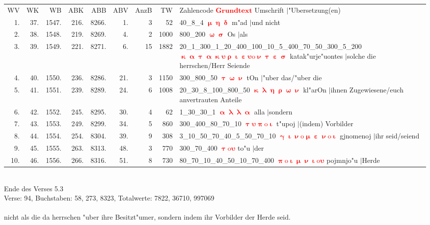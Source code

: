 \documentclass[a4paper,10pt,landscape]{article}
\begin{document}
\begin{tabular}{rrrrrrrrp{120mm}}
WV&WK&WB&ABK&ABB&ABV&AnzB&TW&Zahlencode \textcolor{red}{$\boldsymbol{Grundtext}$} Umschrift $|$"Ubersetzung(en)\\
1.&37.&1547.&216.&8266.&1.&3&52&40\_8\_4 \textcolor{red}{$\boldsymbol{\upmu\upeta\updelta}$} m"ad $|$und nicht\\
2.&38.&1548.&219.&8269.&4.&2&1000&800\_200 \textcolor{red}{$\boldsymbol{\upomega\upsigma}$} Os $|$als\\
3.&39.&1549.&221.&8271.&6.&15&1882&20\_1\_300\_1\_20\_400\_100\_10\_5\_400\_70\_50\_300\_5\_200 \textcolor{red}{$\boldsymbol{\upkappa\upalpha\uptau\upalpha\upkappa\upsilon\uprho\upiota\upepsilon\upsilon\mathrm{o}\upnu\uptau\upepsilon\upsigma}$} katak"urje"uontes $|$solche die herrschen/Herr Seiende\\
4.&40.&1550.&236.&8286.&21.&3&1150&300\_800\_50 \textcolor{red}{$\boldsymbol{\uptau\upomega\upnu}$} tOn $|$"uber das/"uber die\\
5.&41.&1551.&239.&8289.&24.&6&1008&20\_30\_8\_100\_800\_50 \textcolor{red}{$\boldsymbol{\upkappa\uplambda\upeta\uprho\upomega\upnu}$} kl"arOn $|$ihnen Zugewiesene/euch anvertrauten Anteile\\
6.&42.&1552.&245.&8295.&30.&4&62&1\_30\_30\_1 \textcolor{red}{$\boldsymbol{\upalpha\uplambda\uplambda\upalpha}$} alla $|$sondern\\
7.&43.&1553.&249.&8299.&34.&5&860&300\_400\_80\_70\_10 \textcolor{red}{$\boldsymbol{\uptau\upsilon\uppi\mathrm{o}\upiota}$} t"upoj $|$(indem) Vorbilder\\
8.&44.&1554.&254.&8304.&39.&9&308&3\_10\_50\_70\_40\_5\_50\_70\_10 \textcolor{red}{$\boldsymbol{\upgamma\upiota\upnu\mathrm{o}\upmu\upepsilon\upnu\mathrm{o}\upiota}$} gjnomenoj $|$ihr seid/seiend\\
9.&45.&1555.&263.&8313.&48.&3&770&300\_70\_400 \textcolor{red}{$\boldsymbol{\uptau\mathrm{o}\upsilon}$} to"u $|$der\\
10.&46.&1556.&266.&8316.&51.&8&730&80\_70\_10\_40\_50\_10\_70\_400 \textcolor{red}{$\boldsymbol{\uppi\mathrm{o}\upiota\upmu\upnu\upiota\mathrm{o}\upsilon}$} pojmnjo"u $|$Herde\\
\end{tabular}\medskip \\
Ende des Verses 5.3\\
Verse: 94, Buchstaben: 58, 273, 8323, Totalwerte: 7822, 36710, 997069\\
\\
nicht als die da herrschen "uber ihre Besitzt"umer, sondern indem ihr Vorbilder der Herde seid.\\
\end{document}
